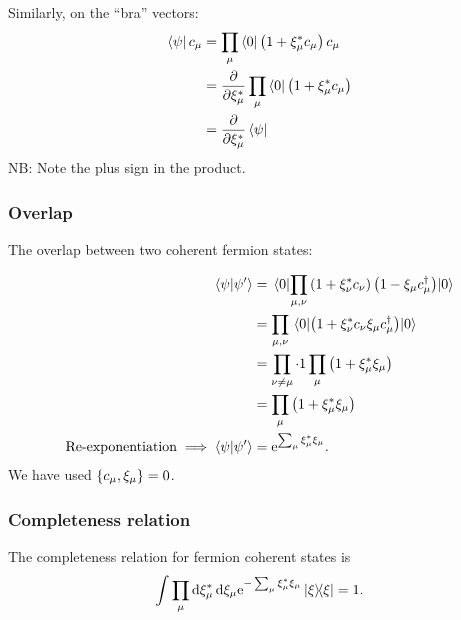 Similarly, on the ``bra'' vectors:
\begin{align*}
\bra\psi c_\mu &= \prod_{\mu}\bra 0 \left(1+\xi_\mu^*c_\mu\right)c_\mu \\
&=\pdv{\xi_\mu^*}\prod_{\mu}\bra 0 \left(1+\xi_\mu^*c_\mu\right)\\
&= \pdv{\xi_\mu^*}\bra\psi
\end{align*}
NB: Note the plus sign in the product.

\subsubsection{Overlap}
The overlap between two coherent fermion states:

\begin{align*}
\braket{\psi}{\psi'} &= \mel{0}{\prod_{\mu, \nu}\left(1+\xi_{\nu}^*c_{\nu}\right)\left(1-\xi_\mu c_\mu^\dagger\right)}{0} \\
&= \prod_{\mu, \nu}\mel{0}{\left(1+\xi_{\nu}^*c_{\nu}\xi_\mu c_\mu^\dagger\right)}{0}\\
&=\prod_{\nu \ne \mu}\cdot 1 \prod_{\mu}\left(1+\xi_\mu^*\xi_\mu\right) \\
&= \prod_{\mu}\left(1+\xi_\mu^*\xi_\mu\right) \\
\text{Re-exponentiation} \implies \braket{\psi}{\psi'} &= \mathrm{e}^{\sum_\mu\xi_\mu^*\xi_\mu}.
\end{align*}
We have used \(\acomm{c_\mu}{\xi_\mu}=0\).

\subsubsection{Completeness relation}

The completeness relation for fermion coherent states is
\begin{equation}
\int \prod_{\mu}\dd{\xi_\mu^*}\dd{\xi_\mu \e^{-\sum_\mu\xi_\mu^*\xi_\mu}}\dyad{\xi} = 1.
\end{equation}

